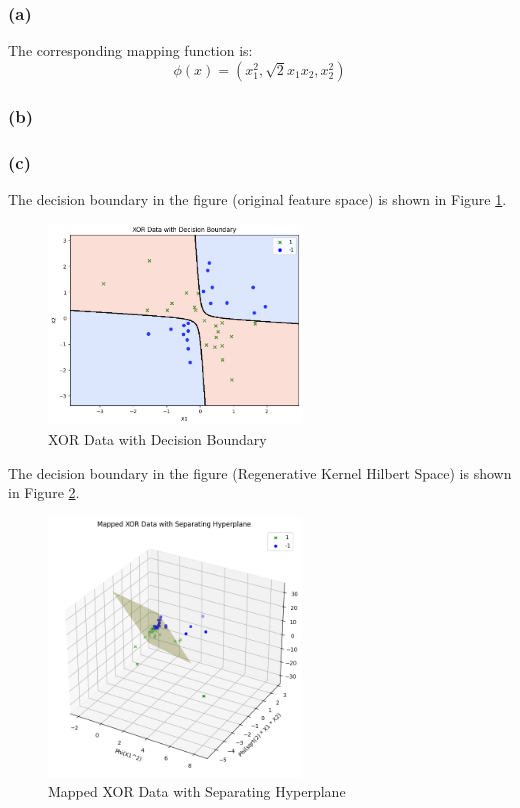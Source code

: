 \documentclass[oneside,solution]{seu-ml-assign}
\begin{document}
\subsubsection{(a)}

The corresponding mapping function is:
\begin{equation}\phi(x)=(x_1^2,\sqrt{2}x_1x_2,x_2^2)\end{equation}


\subsubsection{(b)}



\subsubsection{(c)}


The decision boundary in the figure (original feature space) is shown in Figure \ref{1.2.c1}.
\begin{figure}[htbp]
  \centering
  \includegraphics[width=0.6\textwidth]{1.2.c1.png}
  \caption[XOR Data with Decision Boundary]{XOR Data with Decision Boundary}
  \label{1.2.c1}
\end{figure}



The decision boundary in the figure (Regenerative Kernel Hilbert Space) is shown in Figure \ref{1.2.c2}.

\begin{figure}[htbp]
  \centering
  \includegraphics[width=0.6\textwidth]{1.2.c2.png}
  \caption[Mapped XOR Data with Separating Hyperplane]{Mapped XOR Data with Separating Hyperplane}
  \label{1.2.c2}
\end{figure}


\vspace{2mm}
\end{document}
